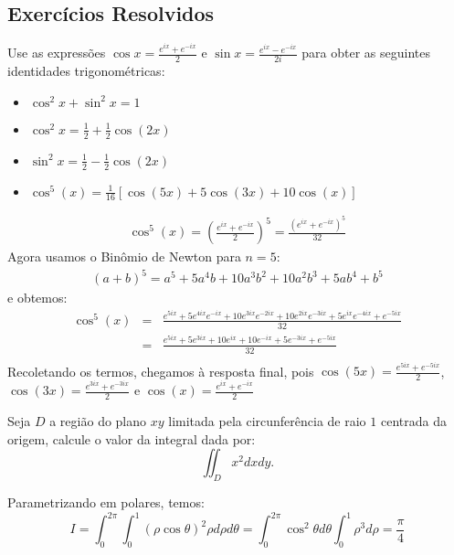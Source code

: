 \subsection*{Exercícios Resolvidos}
\begin{exeresol}Use as expressões $\cos x=\frac{e^{ix}+e^{-ix}}{2}$ e $\sin x=\frac{e^{ix}-e^{-ix}}{2i}$ para obter as seguintes identidades trigonométricas:
\begin{itemize}
\item $\cos^2x+\sin^2x=1$
\item $\cos^2x=\frac{1}{2}+\frac{1}{2}\cos(2x)$
\item $\sin^2x=\frac{1}{2}-\frac{1}{2}\cos(2x)$
\item $\cos^5(x)=\frac{1}{16}\left[\cos(5x)+5\cos(3x)+10\cos(x)\right]$
\end{itemize}
\end{exeresol}
\begin{resol}
\begin{eqnarray*}
\cos^5(x)=\left(\frac{e^{ix}+e^{-ix}}{2}\right)^5=\frac{\left({e^{ix}+e^{-ix}}\right)^5}{32}
\end{eqnarray*}
Agora usamos o Binômio de Newton para $n=5$:
\begin{eqnarray*}
(a+b)^5=a^5+5a^4b+10a^3b^2+10a^2b^3+5ab^4+b^5
\end{eqnarray*}
e obtemos:
\begin{eqnarray*}
\cos^5(x)&=&\frac{{e^{5ix}+5e^{4ix}e^{-ix}+10e^{3ix}e^{-2ix}+10e^{2ix}e^{-3ix}+5e^{ix}e^{-4ix}+e^{-5ix}}}{32}\\
&=&\frac{{e^{5ix}+5e^{3ix}+10e^{ix}+10e^{-ix}+5e^{-3ix}+e^{-5ix}}}{32}\\
\end{eqnarray*}
Recoletando os termos, chegamos à resposta final, pois $\cos(5x)=\frac{e^{5ix}+e^{-5ix}}{2}$,$\cos(3x)=\frac{e^{3ix}+e^{-3ix}}{2}$ e $\cos(x)=\frac{e^{ix}+e^{-ix}}{2}$
\end{resol}

\begin{exeresol}Seja $D$ a região do plano $xy$ limitada pela circunferência de raio $1$ centrada da origem, calcule o valor da integral dada por:
$$\iint_D x^2 dxdy.$$
\end{exeresol}
\begin{resol}Parametrizando em polares, temos:
$$I= \int_0^{2\pi}\int_0^1 (\rho\cos\theta)^2\rho d\rho d\theta=\int_{0}^{2\pi}\cos^2\theta d\theta\int_0^1\rho^3d\rho=\frac{\pi}{4}$$
\end{resol}


